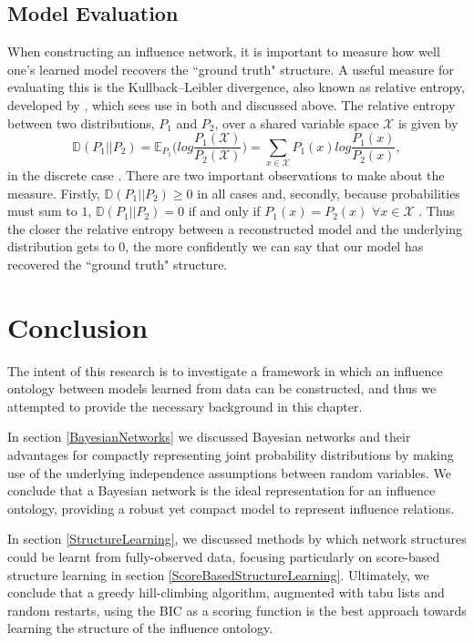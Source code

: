 \documentclass [11pt]{article}
\begin{document}
\subsection{Model Evaluation}\label{ModelEvaluation}
When constructing an influence network, it is important to measure how well one's learned model recovers the ``ground truth" structure. A useful measure for evaluating this is the Kullback–Leibler divergence, also known as relative entropy, developed by \cite{kullback1951}, which sees use in both \cite{ajoodha17} and \cite{ajoodha18} discussed above. The relative entropy between two distributions, $P_{1}$ and $P_{2}$, over a shared variable space $\mathcal{X}$ is given by
\begin{equation*}
\mathbb{D}(P_{1}||P_{2}) = \mathbb{E}_{P_{1}}\Bigg(log\frac{P_{1}(\mathcal{X})}{P_{2}(\mathcal{X})}\Bigg) = \sum_{x\in\mathcal{X}}P_{1}(x)log\frac{P_{1}(x)}{P_{2}(x)},
\end{equation*}
in the discrete case \citep{koller09}. There are two important observations to make about the measure. Firstly, $\mathbb{D}(P_{1}||P_{2}) \geq 0$ in all cases and, secondly, because probabilities must sum to $1$, $\mathbb{D}(P_{1}||P_{2}) = 0$ if and only if $P_{1}(x) = P_{2}(x)$ $\forall x\in\mathcal{X}$ \citep{koller09}. Thus the closer the relative entropy between a reconstructed model and the underlying distribution gets to $0$, the more confidently we can say that our model has recovered the ``ground truth" structure.
\section{Conclusion}
The intent of this research is to investigate a framework in which an influence ontology between models learned from data can be constructed, and thus we attempted to provide the necessary background in this chapter.

In section \ref{BayesianNetworks} we discussed Bayesian networks and their advantages for compactly representing joint probability distributions by making use of the underlying independence assumptions between random variables. We conclude that a Bayesian network is the ideal representation for an influence ontology, providing a robust yet compact model to represent influence relations.

In section \ref{StructureLearning}, we discussed methods by which network structures could be learnt from fully-observed data, focusing particularly on score-based structure learning in section \ref{ScoreBasedStructureLearning}. Ultimately, we conclude that a greedy hill-climbing algorithm, augmented with tabu lists and random restarts, using the BIC as a scoring function is the best approach towards learning the structure of the influence ontology.
\end{document}
